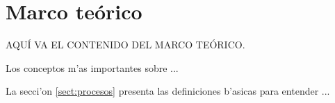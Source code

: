 \chapter{Marco teórico} \label{chap:marco_teorico}

AQU\'I VA EL CONTENIDO DEL MARCO TE\'ORICO.

Los conceptos m'as importantes sobre ...

La secci'on \ref{sect:procesos} presenta las definiciones b'asicas para
entender ...

